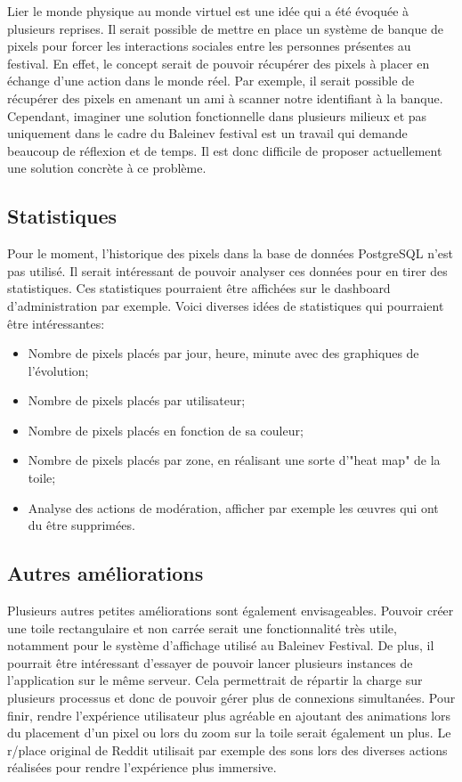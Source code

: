 Lier le monde physique au monde virtuel est une idée qui a été évoquée à plusieurs reprises. Il serait possible de mettre en place un système de banque de pixels pour forcer les interactions sociales entre les personnes présentes au festival. En effet, le concept serait de pouvoir récupérer des pixels à placer en échange d'une action dans le monde réel. Par exemple, il serait possible de récupérer des pixels en amenant un ami à scanner notre identifiant à la banque. Cependant, imaginer une solution fonctionnelle dans plusieurs milieux et pas uniquement dans le cadre du Baleinev festival est un travail qui demande beaucoup de réflexion et de temps. Il est donc difficile de proposer actuellement une solution concrète à ce problème.

\subsection{Statistiques}

Pour le moment, l'historique des pixels dans la base de données PostgreSQL n'est pas utilisé. Il serait intéressant de pouvoir analyser ces données pour en tirer des statistiques. Ces statistiques pourraient être affichées sur le dashboard d'administration par exemple. Voici diverses idées de statistiques qui pourraient être intéressantes:

\begin{itemize}
  \item Nombre de pixels placés par jour, heure, minute avec des graphiques de l'évolution;
  \item Nombre de pixels placés par utilisateur;
  \item Nombre de pixels placés en fonction de sa couleur;
  \item Nombre de pixels placés par zone, en réalisant une sorte d'"heat map" de la toile;
  \item Analyse des actions de modération, afficher par exemple les \oe{}uvres qui ont du être supprimées.
\end{itemize}

\subsection{Autres améliorations}

Plusieurs autres petites améliorations sont également envisageables. Pouvoir créer une toile rectangulaire et non carrée serait une fonctionnalité très utile, notamment pour le système d'affichage utilisé au Baleinev Festival. De plus, il pourrait être intéressant d'essayer de pouvoir lancer plusieurs instances de l'application sur le même serveur. Cela permettrait de répartir la charge sur plusieurs processus et donc de pouvoir gérer plus de connexions simultanées. Pour finir, rendre l'expérience utilisateur plus agréable en ajoutant des animations lors du placement d'un pixel ou lors du zoom sur la toile serait également un plus. Le r/place original de Reddit utilisait par exemple des sons lors des diverses actions réalisées pour rendre l'expérience plus immersive.

\vfil
\hspace{8cm}\makeatletter\@author\makeatother\par
\hspace{8cm}\begin{minipage}{5cm}
  \printsignature
\end{minipage}
